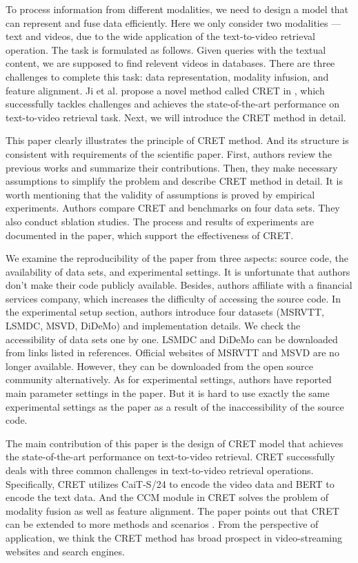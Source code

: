 \documentclass{article}
\begin{document}
To process information from different modalities, we need to design a model that can represent and fuse data efficiently. Here we only consider two modalities --- text and videos, due to the wide application of the text-to-video retrieval operation. The task is formulated as follows. Given queries with the textual content, we are supposed to find relevent videos in databases. There are three challenges to complete this task: data representation, modality infusion, and feature alignment. Ji et al. propose a novel method called CRET in \cite{cret}, which successfully tackles challenges and achieves the state-of-the-art performance on text-to-video retrieval task. Next, we will introduce the CRET method in detail.


This paper clearly illustrates the principle of CRET method. And its structure is consistent with requirements of the scientific paper. First, authors review the previous works and summarize their contributions. Then, they make necessary assumptions to simplify the problem and describe CRET method in detail. It is worth mentioning that the validity of assumptions is proved by empirical experiments. Authors compare CRET and benchmarks on four data sets. They also conduct sblation studies. The process and results of experiments are documented in the paper, which support the effectiveness of CRET.

We examine the reproducibility of the paper from three aspects: source code, the availability of data sets, and experimental settings. It is unfortunate that authors don't make their code publicly available. Besides, authors affiliate with a financial services company, which increases the difficulty of accessing the source code. In the experimental setup section, authors introduce four datasets (MSRVTT, LSMDC, MSVD, DiDeMo) and implementation details. We check the accessibility of data sets one by one. LSMDC and DiDeMo can be downloaded from links listed in references. Official websites of MSRVTT and MSVD are no longer available. However, they can be downloaded from the open source community alternatively. As for experimental settings, authors have reported main parameter settings in the paper. But it is hard to use exactly the same experimental settings as the paper as a result of the inaccessibility of the source code.

The main contribution of this paper is the design of CRET model that achieves the state-of-the-art performance on text-to-video retrieval. CRET successfully deals with three common challenges in text-to-video retrieval operations. Specifically, CRET utilizes CaiT-S/24 to encode the video data and BERT to encode the text data. And the CCM module in CRET solves the problem of modality fusion as well as feature alignment. The paper points out that CRET can be extended to more methods and scenarios \cite{cret}. From the perspective of application, we think the CRET method has broad prospect in video-streaming websites and search engines.
\end{document}

